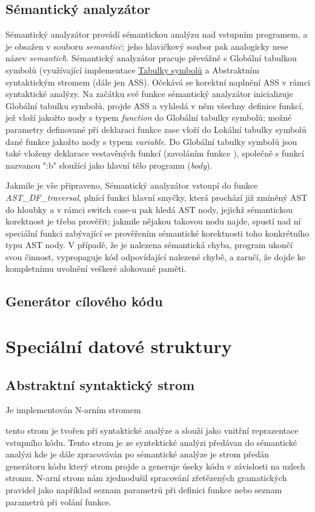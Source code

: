 \documentclass[a4paper, 11pt]{article}
\begin{document}
	\subsection{Sémantický analyzátor}
	\label{semantic}
	Sémantický analyzátor provádí sémantickou analýzu nad vstupním programem, a je obsažen v souboru \textit{semantic\.c}; jeho hlavičkový soubor pak 
	analogicky nese název \textit{semantic\.h}. Sémantický analyzátor pracuje převážně s Globální tabulkou symbolů (využívající implementace 
	\hyperref[symtab]{Tabulky symbolů} a Abstraktním syntaktickým stromem (dále jen ASS). Očekává se korektní naplnění ASS v rámci syntaktické analýzy. Na 
	začátku své funkce sémantický analyzátor inicializuje Globální tabulku symbolů, projde ASS a vyhledá v něm všechny definice funkcí, jež vloží jakožto nody s 
	typem \textit{function} do Globální tabulky symbolů; možné parametry definované při deklaraci funkce zase vloží do Lokální tabulky symbolů dané funkce 
	jakožto nody s typem \textit{variable}. Do Globální tabulky symbolů jsou také vloženy deklarace vestavěných funkcí (zavoláním funkce ), společně s funkcí 
	nazvanou ":b" sloužící jako hlavní tělo programu (\textit{body}).

	Jakmile je vše připraveno, Sémantický analyzátor vstoupí do funkce \textit{AST\_DF\_traversal}, plnící funkci hlavní smyčky, která prochází již zmíněný AST 
	do hloubky a v rámci switch case-u pak hledá AST nody, jejichž sémantickou korektnost je třeba prověřit; jakmile nějakou takovou nodu najde, spustí nad ní 
	speciální funkci zabývající se prověřením sémantické korektnosti toho konkrétního typu AST nody. V případě, že je nalezena sémantická chyba, program 
	ukončí svou činnost, vypropaguje kód odpovídající nalezené chybě, a zaručí, že dojde ke kompletnímu uvolnění veškeré alokované paměti.
	\subsection{Generátor cílového kódu}
	\section{Speciální datové struktury}
    \subsection{Abstraktní syntaktický strom}
    Je implementován N-arním stromem tento strom je tvořen při syntaktické analýze a slouží jako vnitřní reprazentace
    vstupního kódu. Tento strom je ze syntektické analýzi předávan do sémantické analýzi kde je dále zpracováván po sémantické analýze je strom předán
    generátoru kódu který strom projde a generuje úseky kódu v závislosti na uzlech stromu. N-arní strom nám zjednodušil spracování zřetězených gramatických
    pravidel jako například seznam parametrů při definici funkce nebo seznam parametrů při volání funkce. 
\end{document}
